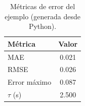 \begin{table}[H]
  \centering
  \caption{Métricas de error del ejemplo (generada desde Python).}
  \label{tab:ejemplo}
  \begin{tabular}{lc}
    \toprule
    Métrica & Valor \\
    \midrule
    MAE & \num{0.021} \\
    RMSE & \num{0.026} \\
    Error máximo & \num{0.087} \\
    $\tau$ (s) & \num{2.500} \\
    \bottomrule
  \end{tabular}
\end{table}
